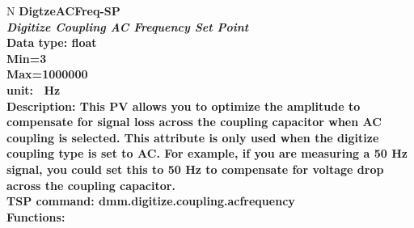 \documentclass[openany]{article}
\begin{document}
		\begin{tabular}{N}
			\hline
			\bfseries DigtzeACFreq-SP\label{pv:digtzeacfreq-sp} \\ \hline
			\emph{Digitize Coupling AC Frequency Set Point} \\
			Data type: float \\
			Min=3\\
			Max=1000000 \\
			unit: \SI{}{\hertz} \\
			Description: This PV allows you to optimize the amplitude to compensate for signal loss across the coupling capacitor when AC coupling is selected. This attribute is only used when the digitize coupling type is set to AC. For example, if you are measuring a 50 Hz signal, you could set this to 50 Hz to compensate for voltage drop across the coupling capacitor. \\
			TSP command: dmm.digitize.coupling.acfrequency \\
			Functions: \\
			\arrayrulecolor{\FuncTableBorderColor}

		\end{tabular}
\end{document}
